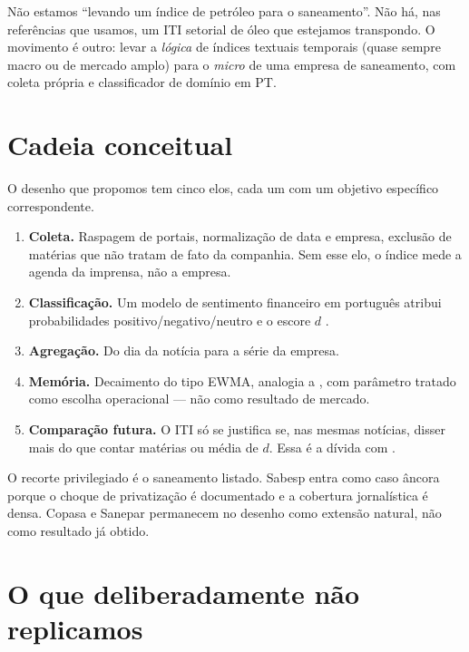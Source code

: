Não estamos ``levando um índice de petróleo para o saneamento''. Não há, nas referências que usamos, um ITI setorial de óleo que estejamos transpondo. O movimento é outro: levar a \emph{lógica} de índices textuais temporais (quase sempre macro ou de mercado amplo) para o \emph{micro} de uma empresa de saneamento, com coleta própria e classificador de domínio em PT.

\section{Cadeia conceitual}

O desenho que propomos tem cinco elos, cada um com um objetivo específico correspondente.

\begin{enumerate}
  \item \textbf{Coleta.} Raspagem de portais, normalização de data e empresa, exclusão de matérias que não tratam de fato da companhia. Sem esse elo, o índice mede a agenda da imprensa, não a empresa.
  \item \textbf{Classificação.} Um modelo de sentimento financeiro em português atribui probabilidades positivo/negativo/neutro e o escore \(d\) \cite{santos2023finbert}.
  \item \textbf{Agregação.} Do dia da notícia para a série da empresa.
  \item \textbf{Memória.} Decaimento do tipo EWMA, analogia a , com parâmetro tratado como escolha operacional --- não como resultado de mercado.
  \item \textbf{Comparação futura.} O ITI só se justifica se, nas mesmas notícias, disser mais do que contar matérias ou média de \(d\). Essa é a dívida com .
\end{enumerate}

O recorte privilegiado é o saneamento listado. Sabesp entra como caso âncora porque o choque de privatização é documentado \cite{foco2025sabesp} e a cobertura jornalística é densa. Copasa e Sanepar permanecem no desenho como extensão natural, não como resultado já obtido.

\iffalse
\section{O que deliberadamente não replicamos}

